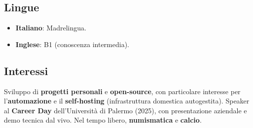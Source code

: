 \documentclass[11pt]{article}
\newcommand{\rside}[1]{
  \hfill {\normalfont\color{accent} #1}%
}
\begin{document}
\subsection{Lingue}
\begin{itemize}
  \item \textbf{Italiano}: Madrelingua.  
  \item \textbf{Inglese}: B1 (conoscenza intermedia).
\end{itemize}

\subsection{Interessi}
\noindent Sviluppo di \textbf{progetti personali} e \textbf{open-source}, con particolare interesse per l'\textbf{automazione} e il \textbf{self-hosting} (infrastruttura domestica autogestita). Speaker al \textbf{Career Day} dell'Università di Palermo (2025), con presentazione aziendale e demo tecnica dal vivo. Nel tempo libero, \textbf{numismatica} e \textbf{calcio}.






\end{document}
